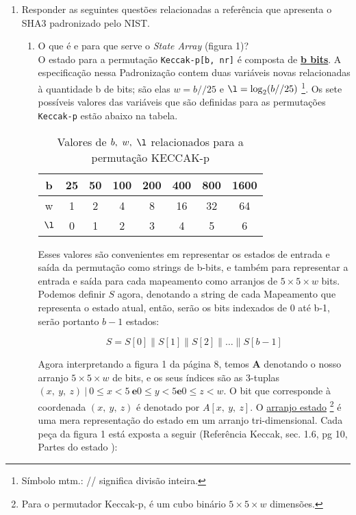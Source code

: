 \documentclass[12pt, a4paper]{article}
\begin{document}
\begin{enumerate}
\item Responder as seguintes questões relacionadas a referência\cite{nist} que
apresenta o SHA3 padronizado pelo NIST.\\

\begin{enumerate}

\item O que é e para que serve o \textit{State Array} (figura 1)?\\

O estado para a permutação \verb|Keccak-p[b, nr]| é composta de
\textbf{\underline{b bits}}. A especificação nessa Padronização contem duas
variáveis novas relacionadas à quantidade b de bits; são elas $w = b // 25$ e
$\l = \log_2(b//25)$ \footnote{Símbolo mtm.: // significa divisão inteira.}. Os
sete possíveis valores das variáveis que são definidas para as permutações
\verb|Keccak-p| estão abaixo na tabela.

\begin{table}[ht!]
  \centering
  \begin{tabular}{|c|c|c|c|c|c|c|c|}
    \hline b & 25 & 50 & 100 & 200 & 400 & 800 & 1600 \\
    \hline w & 1 & 2 & 4 & 8 & 16 & 32 & 64 \\
    \hline $\l$ & 0 & 1 & 2 & 3 & 4 & 5 & 6 \\
    \hline
  \end{tabular}
  \caption{Valores de $b,\ w,\ \l$ relacionados para a permutação KECCAK-p}
\end{table}

Esses valores são convenientes em representar os estados de entrada e saída da
permutação como strings de b-bits, e também para representar a entrada e saída
para cada mapeamento como arranjos de $5\times 5\times w$ bits. Podemos definir
$S$ agora, denotando a string de cada Mapeamento que representa o estado atual,
então, serão os bits indexados de 0 até b-1, serão portanto $b-1$ estados:

$$S=S[0]\parallel S[1]\parallel S[2]\parallel \ldots \parallel S[b-1]$$

Agora interpretando a figura 1 da página 8, temos \textbf{A} denotando o nosso
arranjo $5\times 5\times w$ de bits, e os seus índices são as 3-tuplas $(x,\ y,\
z)\ |\ 0 \le x < 5\ \textbf{e} 0 \le y < 5 \textbf{e} 0 \le z < w$. O bit que
corresponde à coordenada $(x,\ y,\ z)$ é denotado por $A[x,\ y,\ z]$. O
\underline{arranjo estado} \footnote{Para o permutador Keccak-p, é um cubo
binário $5\times 5\times w$ dimensões.} é uma mera representação do estado em um
arranjo tri-dimensional. Cada peça da figura 1 está exposta a seguir
(Referência Keccak, sec. 1.6, pg 10, Partes do estado \cite{bertoni}):\\


\end{enumerate}
\end{enumerate}
\end{document}
